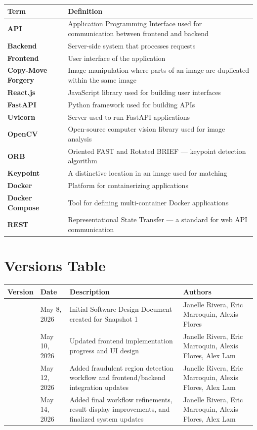 \documentclass[12pt]{article}
\begin{document}
\begin{longtable}{>{\bfseries}p{} p{}}
\toprule
Term & Definition \\
\midrule
\endhead
API & Application Programming Interface used for communication between frontend and backend \\[0.5em]
Backend & Server-side system that processes requests \\[0.5em]
Frontend & User interface of the application \\[0.5em]
Copy-Move Forgery & Image manipulation where parts of an image are duplicated within the same image \\[0.5em]
React.js & JavaScript library used for building user interfaces \\[0.5em]
FastAPI & Python framework used for building APIs \\[0.5em]
Uvicorn & Server used to run FastAPI applications \\[0.5em]
OpenCV & Open-source computer vision library used for image analysis \\[0.5em]
ORB & Oriented FAST and Rotated BRIEF --- keypoint detection algorithm \\[0.5em]
Keypoint & A distinctive location in an image used for matching \\[0.5em]
Docker & Platform for containerizing applications \\[0.5em]
Docker Compose & Tool for defining multi-container Docker applications \\[0.5em]
REST & Representational State Transfer --- a standard for web API communication \\
\bottomrule
\end{longtable}

\section{Versions Table}

\begin{table}[h]
\centering
\begin{tabular}{>{\centering}p{} >{\centering}p{} p{} p{}}
\toprule
\textbf{Version} & \textbf{Date} & \textbf{Description} & \textbf{Authors} \\
\midrule
1.0 & May 8, 2026 & Initial Software Design Document created for Snapshot 1 & Janelle Rivera, Eric Marroquin, Alexis Flores \\[0.5em]
1.1 & May 10, 2026 & Updated frontend implementation progress and UI design & Janelle Rivera, Eric Marroquin, Alexis Flores, Alex Lam \\[0.5em]
1.2 & May 12, 2026 & Added fraudulent region detection workflow and frontend/backend integration updates & Janelle Rivera, Eric Marroquin, Alexis Flores, Alex Lam \\[0.5em]
1.3 & May 14, 2026 & Added final workflow refinements, result display improvements, and finalized system updates & Janelle Rivera, Eric Marroquin, Alexis Flores, Alex Lam \\
\bottomrule
\end{tabular}
\end{table}
\end{document}
